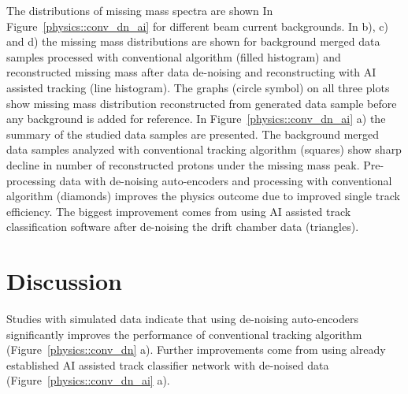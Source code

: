The distributions of missing mass spectra are shown In Figure~\ref{physics::conv_dn_ai} for different beam current backgrounds.
In b), c) and d) the missing mass distributions are shown for background merged data samples processed with conventional algorithm 
(filled histogram) and reconstructed missing mass after data de-noising and reconstructing with AI assisted tracking (line histogram).
The graphs (circle symbol) on all three plots show missing mass distribution reconstructed from generated data sample 
before any background is added for reference. In Figure~\ref{physics::conv_dn_ai} a) the summary of the studied data samples 
are presented. The background merged data samples analyzed with conventional tracking algorithm (squares) show sharp decline in
number of reconstructed protons under the missing mass peak. Pre-processing data with de-noising auto-encoders and processing
with conventional algorithm (diamonds) improves the physics outcome due to improved single track efficiency. The biggest improvement
comes from using AI assisted track classification software after de-noising the drift chamber data (triangles). 


\section{Discussion}

Studies with simulated data indicate that using de-noising auto-encoders significantly improves the performance
of conventional tracking algorithm (Figure~\ref{physics::conv_dn} a). Further improvements come from using
already established AI assisted track classifier network with de-noised data (Figure~\ref{physics::conv_dn_ai} a).

